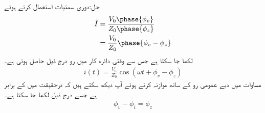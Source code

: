 حل:دوری سمتیات استعمال کرتے ہوئے
\begin{align*}
\hat{I}&=\frac{V_0\phase{\phi_v}}{Z_0\phase{\phi_z}}\\
&=\frac{V_0}{Z_0}\phase{\phi_v-\phi_z}
\end{align*}
لکھا جا سکتا ہے جس سے وقتی دائرہ کار میں رو درج ذیل حاصل ہوتی ہے۔
\begin{align}
i(t)=\frac{V_0}{Z_0} \cos(\omega t+\phi_v-\phi_z)
\end{align}
مساوات  میں دیے عمومی رو کے ساتھ موازنہ کرتے ہوئے آپ دیکھ سکتے ہیں کہ  درحقیقت میں  کے برابر ہے  جسے درج ذیل لکھا جا سکتا ہے۔
\begin{align}\label{مساوات_طاقت_زاویہ_رکاوٹ_اور_طاقت}
\phi_v-\phi_i=\phi_z
\end{align}


